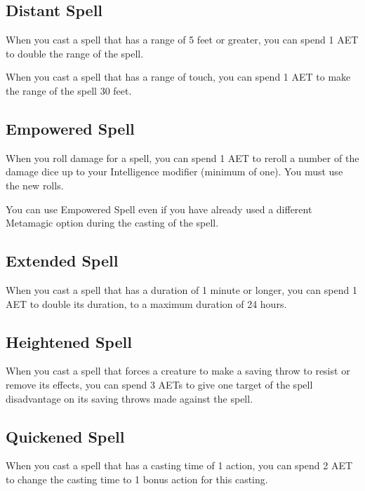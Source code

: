 \subsection{Distant Spell}

When you cast a spell that has a range of 5 feet or greater, you can spend 1 AET to double the range of the spell.

When you cast a spell that has a range of touch, you can spend 1 AET to make the range of the spell 30 feet.

\subsection{Empowered Spell}

When you roll damage for a spell, you can spend 1 AET to reroll a number of the damage dice up to your Intelligence modifier (minimum of one). You must use the new rolls.

You can use Empowered Spell even if you have already used a different Metamagic option during the casting of the spell.

\subsection{Extended Spell}

When you cast a spell that has a duration of 1 minute or longer, you can spend 1 AET to double its duration, to a maximum duration of 24 hours.

\subsection{Heightened Spell}

When you cast a spell that forces a creature to make a saving throw to resist or remove its effects, you can spend 3 AETs to give one target of the spell disadvantage on its saving throws made against the spell.

\subsection{Quickened Spell}

When you cast a spell that has a casting time of 1 action, you can spend 2 AET to change the casting time to 1 bonus action for this casting.

